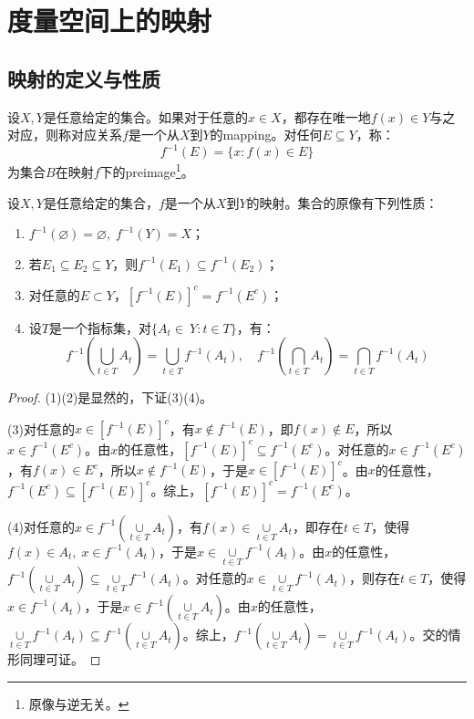 \section{度量空间上的映射}
\subsection{映射的定义与性质}
\begin{definition}
	设$X,Y$是任意给定的集合。如果对于任意的$x\in X$，都存在唯一地$f(x)\in Y$与之对应，则称对应关系$f$是一个从$X$到$Y$的\gls{mapping}。对任何$E\subseteq Y$，称：
	\begin{equation*}
		f^{-1}(E)=\{x:f(x)\in E\}
	\end{equation*}
	为集合$B$在映射$f$下的\gls{preimage}\footnote{原像与逆无关。}。
\end{definition}
\begin{theorem}\label{theo:PropertyOfPreimage}
	设$X,Y$是任意给定的集合，$f$是一个从$X$到$Y$的映射。集合的原像有下列性质：
	\begin{enumerate}
		\item $f^{-1}(\varnothing)=\varnothing,\;f^{-1}(Y)=X$；
		\item 若$E_1\subseteq E_2\subseteq Y$，则$f^{-1}(E_1)\subseteq f^{-1}(E_2)$；
		\item 对任意的$E\subset Y$，$[f^{-1}(E)]^c=f^{-1}(E^c)$；
		\item 设$T$是一个指标集，对$\{A_t\in\ Y:t\in T\}$，有：
		\begin{equation*}
			f^{-1}\left(\underset{t\in T}{\bigcup}A_t\right)=\underset{t\in T}{\bigcup}f^{-1}(A_t), \quad
			f^{-1}\left(\underset{t\in T}{\bigcap}A_t\right)=\underset{t\in T}{\bigcap}f^{-1}(A_t)
		\end{equation*}
	\end{enumerate}
\end{theorem}
\begin{proof}
	(1)(2)是显然的，下证(3)(4)。\par
	(3)对任意的$x\in[f^{-1}(E)]^c$，有$x\notin f^{-1}(E)$，即$f(x)\notin E$，所以$x\in f^{-1}(E^c)$。由$x$的任意性，$[f^{-1}(E)]^c\subseteq f^{-1}(E^c)$。对任意的$x\in f^{-1}(E^c)$，有$f(x)\in E^c$，所以$x\notin f^{-1}(E)$，于是$x\in[f^{-1}(E)]^c$。由$x$的任意性，$f^{-1}(E^c)\subseteq[f^{-1}(E)]^c$。综上，$[f^{-1}(E)]^c=f^{-1}(E^c)$。\par
	(4)对任意的$x\in f^{-1}\left(\underset{t\in T}{\cup}A_t\right)$，有$f(x)\in\underset{t\in T}{\cup}A_t$，即存在$t\in T$，使得$f(x)\in A_t,\;x\in f^{-1}(A_t)$，于是$x\in\underset{t\in T}{\cup}f^{-1}(A_t)$。由$x$的任意性，$f^{-1}\left(\underset{t\in T}{\cup}A_t\right)\subseteq\underset{t\in T}{\cup}f^{-1}(A_t)$。对任意的$x\in\underset{t\in T}{\cup}f^{-1}(A_t)$，则存在$t\in T$，使得$x\in f^{-1}(A_t)$，于是$x\in f^{-1}\left(\underset{t\in T}{\cup}A_t\right)$。由$x$的任意性，$\underset{t\in T}{\cup}f^{-1}(A_t)\subseteq f^{-1}\left(\underset{t\in T}{\cup}A_t\right)$。综上，$f^{-1}\left(\underset{t\in T}{\cup}A_t\right)=\underset{t\in T}{\cup}f^{-1}(A_t)$。交的情形同理可证。
\end{proof}

